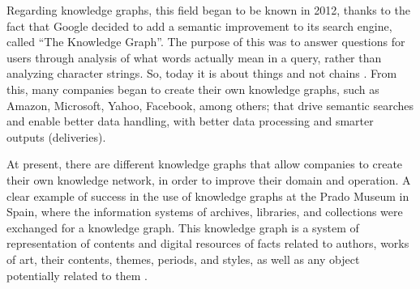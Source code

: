 Regarding knowledge graphs, this field began to be known in 2012, thanks to the fact that Google decided to add a semantic improvement to its search engine, called “The Knowledge Graph”. The purpose of this was to answer questions for users through analysis of what words actually mean in a query, rather than analyzing character strings. So, today it is about things and not chains \cite{Barnard}. From this, many companies began to create their own knowledge graphs, such as Amazon, Microsoft, Yahoo, Facebook, among others; that drive semantic searches and enable better data handling, with better data processing and smarter outputs (deliveries).

At present, there are different knowledge graphs that allow companies to create their own knowledge network, in order to improve their domain and operation. A clear example of success in the use of knowledge graphs at the Prado Museum in Spain, where the information systems of archives, libraries, and collections were exchanged for a knowledge graph. This knowledge graph is a system of representation of contents and digital resources of facts related to authors, works of art, their contents, themes, periods, and styles, as well as any object potentially related to them \cite{Museo del Prado}.


